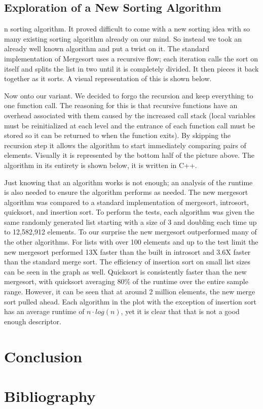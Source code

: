 \documentclass[12pt]{article}
\begin{document}
	
	
	\subsection{Exploration of a New Sorting Algorithm}
	
	n sorting algorithm. It proved difficult to come with a new sorting idea with so many existing sorting algorithm already on our mind.
	So instead we took an already well known algorithm and put a twist on it. 
	The standard implementation of Mergesort uses a recursive flow; each iteration calls the sort on itself and splits the list in two until it is completely divided. 
	It then pieces it back together as it sorts. 
	A visual representation of this is shown below.

	
	Now onto our variant. 
	We decided to forgo the recursion and keep everything to one function call. 
	The reasoning for this is that recursive functions have an overhead associated with them caused by the increased call stack (local variables must be reinitialized at each level and the entrance of each function call must be stored so it can be returned to when the function exits). 
	By skipping the recursion step it allows the algorithm to start immediately comparing pairs of elements. 
	Visually it is represented by the bottom half of the picture above. 
	The algorithm in its entirety is shown below, it is written in C++.
	
		

	Just knowing that an algorithm works is not enough; an analysis of the runtime is also needed to ensure the algorithm performs as needed. 
	The new mergesort algorithm was compared to a standard implementation of mergesort, introsort, quicksort, and insertion sort. 
	To perform the tests, each algorithm was given the same randomly generated list starting with a size of 3 and doubling each time up to 12,582,912 elements. 
	To our surprise the new mergesort outperformed many of the other algorithms. 
	For lists with over 100 elements and up to the test limit the new mergesort performed 13X faster than the built in introsort and 3.6X faster than the standard merge sort. 
	The efficiency of insertion sort on small list sizes can be seen in the graph as well. Quicksort is consistently faster than the new mergesort, with quicksort averaging 80\% of the runtime over the entire sample range. 
	However, it can be seen that at around 2 million elements, the new merge sort pulled ahead. 
	Each algorithm in the plot with the exception of insertion sort has an average runtime of $ n \cdot log (n) $, yet it is clear that that is not a good enough descriptor.




\section{Conclusion}



\section{Bibliography}%
\end{document}
